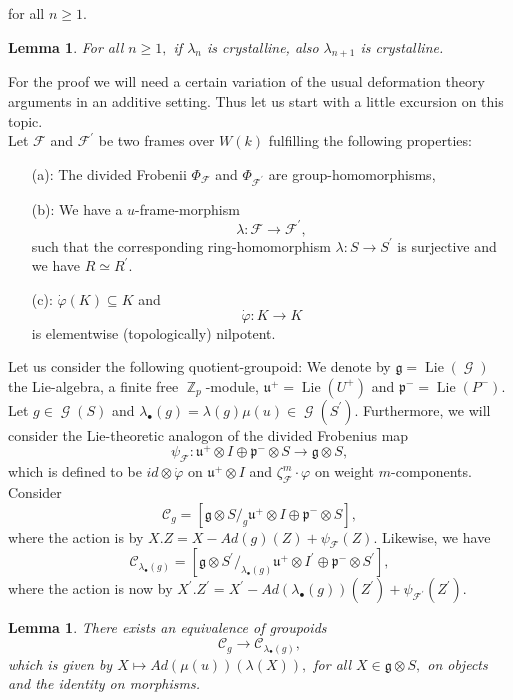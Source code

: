 \documentclass[a4paper,10,5 pt]{amsart}
\newtheorem{Lemma}[Satz]{Lemma}
\theoremstyle{definition}
\DeclareMathOperator{\Lie}{Lie}
\DeclareMathOperator{\G}{\mathcal{G}}
\DeclareMathOperator{\Z}{\mathbb{Z}}
\begin{document}
for all $n\geq 1.$
\begin{Lemma}\label{Liften von kristallinen Morphismen modulo p}
For all $n\geq 1,$ if $\lambda_{n}$ is crystalline, also $\lambda_{n+1}$ is crystalline.
\end{Lemma}
For the proof we will need a certain variation of the usual deformation theory arguments in an additive setting. Thus let us start with a little excursion on this topic.
\\
Let $\mathcal{F}$ and $\mathcal{F}^{\prime}$ be two frames over $W(k)$ fulfilling the following properties:
\begin{enumerate}
\item[(a):] The divided Frobenii $\Phi_{\mathcal{F}}$ and $\Phi_{\mathcal{F}^{\prime}}$ are group-homomorphisms,
\item[(b):] We have a $u$-frame-morphism 
$$
\lambda\colon \mathcal{F}\rightarrow \mathcal{F}^{\prime},
$$
such that the corresponding ring-homomorphism $\lambda\colon S\rightarrow S^{\prime}$ is surjective and we have $R\simeq R^{\prime}.$
\item[(c):] $\dot{\varphi}(K)\subseteq K$ and
$$\dot{\varphi}\colon K\rightarrow K$$
is elementwise (topologically) nilpotent.
\end{enumerate}
Let us consider the following quotient-groupoid: We denote by $\mathfrak{g}=\Lie(\G)$ the Lie-algebra, a finite free $\Z_{p}$-module, $\mathfrak{u}^{+}=\Lie(U^{+})$ and $\mathfrak{p}^{-}=\Lie(P^{-}).$ Let $g\in \G(S)$ and $\lambda_{\bullet}(g)=\lambda(g)\mu(u)\in \G(S^{\prime}).$ Furthermore, we will consider the Lie-theoretic analogon of the divided Frobenius map
$$
\psi_{\mathcal{F}} \colon \mathfrak{u}^{+}\otimes I \oplus \mathfrak{p}^{-} \otimes S \rightarrow \mathfrak{g}\otimes S,
$$
which is defined to be $id\otimes \dot{\varphi}$ on $\mathfrak{u}^{+}\otimes I$ and $\zeta_{\mathcal{F}}^{m}\cdot \varphi$ on weight $m$-components. Consider
$$
\mathcal{C}_{g}=[\mathfrak{g}\otimes S/_{g} \mathfrak{u}^{+}\otimes I \oplus \mathfrak{p}^{-}\otimes S],
$$
where the action is by $X.Z=X-Ad(g)(Z)+\psi_{\mathcal{F}}(Z).$ Likewise, we have
$$
\mathcal{C}_{\lambda_{\bullet}(g)}=[\mathfrak{g}\otimes S^{\prime}/_{\lambda_{\bullet}(g)} \mathfrak{u}^{+}\otimes I^{\prime} \oplus \mathfrak{p}^{-}\otimes S^{\prime}],
$$
where the action is now by $X^{\prime}.Z^{\prime}=X^{\prime}-Ad(\lambda_{\bullet}(g))(Z^{\prime})+\psi_{\mathcal{F}^{\prime}}(Z^{\prime}).$
\begin{Lemma}\label{Aequivalenz der Fasern unter Reduktion modulo p}
There exists an equivalence of groupoids
$$
\mathcal{C}_{g}\rightarrow \mathcal{C}_{\lambda_{\bullet}(g)},
$$
which is given by $X\mapsto Ad(\mu(u))(\lambda(X)),$ for all $X\in \mathfrak{g}\otimes S,$ on objects and the identity on morphisms.
\end{Lemma}
\end{document}

